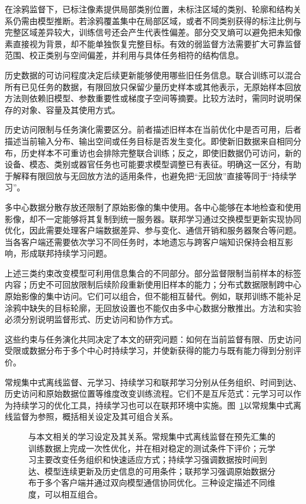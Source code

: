 在涂鸦监督下，已标注像素提供局部类别位置，未标注区域的类别、轮廓和结构关系仍需由模型推断。若涂鸦覆盖集中在局部区域，或者不同类别获得的标注比例与完整区域差异较大，训练信号还会产生代表性偏差。部分交叉熵可以避免把未知像素直接视为背景，却不能单独恢复完整目标。有效的弱监督方法需要扩大可靠监督范围、校正类别与空间偏差，并利用与具体任务相符的结构信息。

历史数据的可访问程度决定后续更新能够使用哪些旧任务信息。联合训练可以混合所有已见任务的数据，有限回放只保留少量历史样本或其他表示，无原始样本回放方法则依赖旧模型、参数重要性或梯度子空间等摘要\cite{delange2022continual,wang2024continualsurvey}。比较方法时，需同时说明保存的对象、容量及其使用方式。

历史访问限制与任务演化需要区分。前者描述旧样本在当前优化中是否可用，后者描述当前输入分布、输出空间或任务目标是否发生变化。即使新旧数据来自相同分布，历史样本不可重访也会排除完整联合训练；反之，即使旧数据仍可访问，新的设备、模态、类别或器官任务也可能要求模型调整已有表征。明确这一区分，有助于解释有限回放与无回放方法的适用条件，也避免把“无回放”直接等同于“持续学习”。

多中心数据分散存放还限制了原始影像的集中使用。各中心能够在本地检查和使用影像，却不一定能够将其复制到统一服务器。联邦学习通过交换模型更新实现协同优化，因此需要处理客户端数据差异、参与变化、通信开销和服务器聚合等问题\cite{mcmahan2017fedavg,rieke2020future}。当各客户端还需要依次学习不同任务时，本地遗忘与跨客户端知识保持会相互影响，形成联邦持续学习问题。

上述三类约束改变模型可利用信息集合的不同部分。部分监督限制当前样本的标签内容；历史不可回放限制后续阶段重新使用旧样本的能力；分布式数据限制跨中心原始影像的集中访问。它们可以组合，但不能相互替代。例如，联邦训练不能补足涂鸦中缺失的目标轮廓，无回放设置也不能仅由多中心数据分散推出。方法和实验必须分别说明监督形式、历史访问和协作方式。

这些约束与任务演化共同决定了本文的研究问题：如何在当前监督有限、历史访问受限或数据分布于多个中心时持续学习，并使新获得的能力与既有能力得到分别评价。

常规集中式离线监督、元学习、持续学习和联邦学习分别从任务组织、时间到达、历史访问和原始数据位置等维度改变训练流程。它们不是互斥范式：元学习可以作为持续学习的优化工具，持续学习也可以在联邦环境中实施。图~\ref{fig:problem-settings-comparison}以常规集中式离线监督为参照，概括相关设定及其可组合关系。

\begin{figure}[htbp]
  \centering
  \captionsetup{font=small,skip=6pt}
  
  \caption[与本文相关的学习设定及其关系。]
  {与本文相关的学习设定及其关系。常规集中式离线监督在预先汇集的训练数据上完成一次性优化，并在相对稳定的测试条件下评价；元学习主要改变任务组织和快速适应方式；持续学习强调数据按时间到达、模型连续更新及历史信息的可用条件；联邦学习强调原始数据分布于多个客户端并通过双向模型通信协同优化。三种设定描述不同维度，可以相互组合。}
  \label{fig:problem-settings-comparison}
\end{figure}

